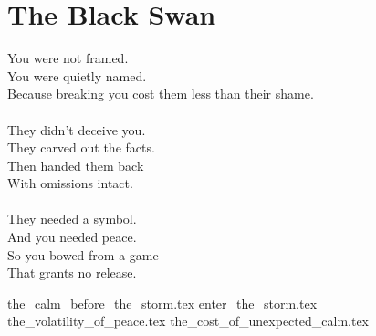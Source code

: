\part{The Black Swan}

\vfill

\begin{flushright}
    \Large
    You were not framed.\\
    You were quietly named.\\
    Because breaking you cost them less than their shame.\\
    \ \\
    They didn’t deceive you.\\
    They carved out the facts.\\
    Then handed them back \\
    With omissions intact.\\
    \ \\
    They needed a symbol.\\
    And you needed peace.\\
    So you bowed from a game\\
    That grants no release.\\
\end{flushright}

{the_calm_before_the_storm.tex}
{enter_the_storm.tex}
{the_volatility_of_peace.tex}
{the_cost_of_unexpected_calm.tex}
